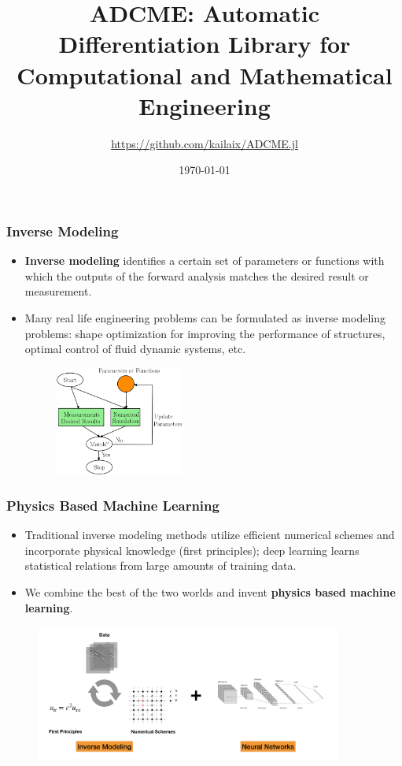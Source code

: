 \documentclass{beamer}
\title[ADCME]{ADCME: Automatic Differentiation Library for Computational and Mathematical Engineering} %
\author{\url{https://github.com/kailaix/ADCME.jl}} %
\institute[] %
{
}
\date{\today} %
\begin{document}
\begin{frame}
\titlepage %

\end{frame}


\begin{frame}
	\frametitle{Inverse Modeling}
	\begin{itemize}
		\item \textbf{Inverse modeling} identifies a certain set of parameters or functions with which the outputs of the forward analysis matches the desired result or measurement.
		\item Many real life engineering problems can be formulated as inverse modeling problems: shape optimization for improving the performance of structures, optimal control of fluid dynamic systems, etc.
		\begin{figure}[hbt]
  \includegraphics[width=0.4\textwidth]{../im.png}
\end{figure}

	\end{itemize}
\end{frame}

\begin{frame}
	\frametitle{Physics Based Machine Learning}
	\begin{itemize}
		\item Traditional inverse modeling methods utilize efficient numerical schemes and incorporate physical knowledge (first principles); deep learning learns statistical relations from large amounts of training data.
		\item We combine the best of the two worlds and invent \textbf{physics based machine learning}. 
	\end{itemize}
	\begin{figure}[hbt]
  \includegraphics[width=0.9\textwidth]{../physics_based_machine_learning.png}
\end{figure}
\end{frame}
\end{document}
